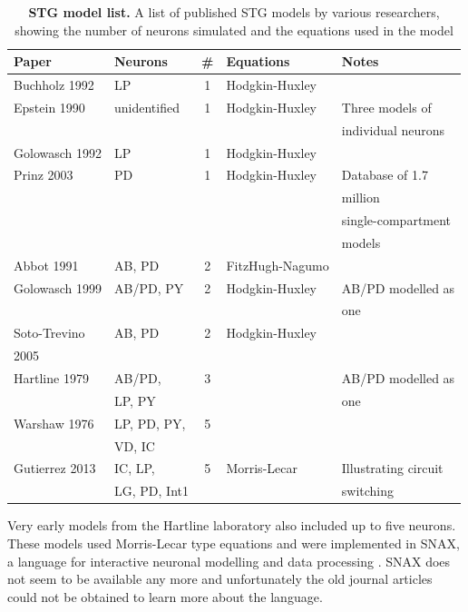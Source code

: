 \begin{table}[H]
	\centering
	\footnotesize
	\caption[\ac{STG} model list]{\textbf{\ac{STG} model list.} A list of published \ac{STG} models by various researchers, showing the number of neurons simulated and the equations used in the model}
	\label{tab:models}
	\begin{tabular}{l l c l l}	
		\textbf{Paper} & \textbf{Neurons} &  \textbf{\#}  & Equations & \textbf{Notes}\\ \hline
		Buchholz 1992 \cite{Buchholtz1992} & LP & 1 & Hodgkin-Huxley & \\
		Epstein 1990 \cite{Epstein1990} & unidentified & 1 & Hodgkin-Huxley & Three models of  \\
		& & & & individual neurons\\
		Golowasch 1992 \cite{Golowasch1992} & LP & 1 & Hodgkin-Huxley & \\ 
		Prinz 2003 \cite{Prinz2003a} & PD & 1 & Hodgkin-Huxley & Database of 1.7 \\
		& & & & million \\
		& & & & single-compartment \\
		& & & & models\\
		
		Abbot 1991 \cite{Abbott1991} & AB, PD & 2 &  FitzHugh-Nagumo & \\
		Golowasch 1999 \cite{Golowasch1999a} & AB/PD, PY & 2 & Hodgkin-Huxley & AB/PD modelled as \\
		& & & & one\\
		Soto-Trevino & AB, PD & 2 & Hodgkin-Huxley & \\
		2005 \cite{Soto-Trevino2005} & & & & \\
		
		Hartline 1979 \cite{Hartline1979} & AB/PD, & 3 &  & AB/PD modelled as\\
		&  LP, PY & & & one\\
		Warshaw 1976 \cite{Warshaw1976} & LP, PD, PY,& 5 & & \\
		& VD, IC & & & \\
		
		Gutierrez 2013 \cite{Gutierrez2013} & IC, LP, & 5 & Morris-Lecar & Illustrating circuit \\
		& LG, PD, Int1 & & & switching\\
	\end{tabular}
\end{table}


Very early models from the Hartline laboratory \cite{Hartline1979, Warshaw1976} also included up to five neurons. These models used Morris-Lecar type equations and were implemented in SNAX, a language for interactive neuronal modelling  and  data  processing \cite{Hartline1976}. SNAX does not seem to be available any more and unfortunately the old journal articles could not be obtained to learn more about the language. 


